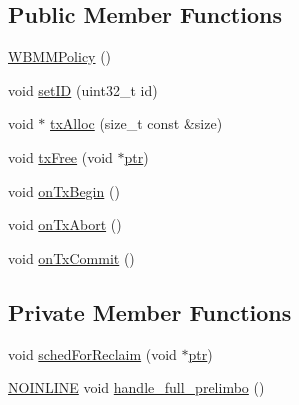 \subsection*{Public Member Functions}
\begin{DoxyCompactItemize}
\item 
\hyperlink{classstm_1_1WBMMPolicy_a7c1d86570793282ba51d64603c6506ce}{W\-B\-M\-M\-Policy} ()
\item 
void \hyperlink{classstm_1_1WBMMPolicy_a60d6f8a5ff5993738e6efce27a7dd698}{set\-I\-D} (uint32\-\_\-t id)
\item 
void $\ast$ \hyperlink{classstm_1_1WBMMPolicy_ac481b44aa708acbe85586077c3237f11}{tx\-Alloc} (size\-\_\-t const \&size)
\item 
void \hyperlink{classstm_1_1WBMMPolicy_ac79df99314937719eafbf91649c464fd}{tx\-Free} (void $\ast$\hyperlink{counted__ptr_8hpp_ac0fd97c9323e3a3981515b00166f14d8}{ptr})
\item 
void \hyperlink{classstm_1_1WBMMPolicy_a66451953ff2a0179699108a0e0b1cba3}{on\-Tx\-Begin} ()
\item 
void \hyperlink{classstm_1_1WBMMPolicy_a659b1e52e3946a9a45fc3abf31dc8800}{on\-Tx\-Abort} ()
\item 
void \hyperlink{classstm_1_1WBMMPolicy_af174b70b9898c8d900a5a2604cfadc7c}{on\-Tx\-Commit} ()
\end{DoxyCompactItemize}
\subsection*{Private Member Functions}
\begin{DoxyCompactItemize}
\item 
void \hyperlink{classstm_1_1WBMMPolicy_aa2aa233946e7b6b1d35b184503b8c9f9}{sched\-For\-Reclaim} (void $\ast$\hyperlink{counted__ptr_8hpp_ac0fd97c9323e3a3981515b00166f14d8}{ptr})
\item 
\hyperlink{platform_8hpp_a1b173d22e57d9395897acbd8de62d505}{N\-O\-I\-N\-L\-I\-N\-E} void \hyperlink{classstm_1_1WBMMPolicy_a80a035e5b8f805d49606613b869ddd3c}{handle\-\_\-full\-\_\-prelimbo} ()
\end{DoxyCompactItemize}

